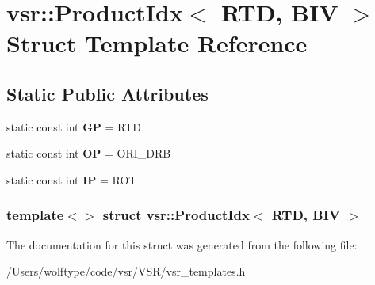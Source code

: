 \hypertarget{structvsr_1_1_product_idx_3_01_r_t_d_00_01_b_i_v_01_4}{\section{vsr\-:\-:Product\-Idx$<$ R\-T\-D, B\-I\-V $>$ Struct Template Reference}
\label{structvsr_1_1_product_idx_3_01_r_t_d_00_01_b_i_v_01_4}
}
\subsection*{Static Public Attributes}
\begin{DoxyCompactItemize}
\item 
\hypertarget{structvsr_1_1_product_idx_3_01_r_t_d_00_01_b_i_v_01_4_acbf421876f88ff8a18b6f8cd358c4d02}{static const int {\bfseries G\-P} = R\-T\-D}\label{structvsr_1_1_product_idx_3_01_r_t_d_00_01_b_i_v_01_4_acbf421876f88ff8a18b6f8cd358c4d02}

\item 
\hypertarget{structvsr_1_1_product_idx_3_01_r_t_d_00_01_b_i_v_01_4_ad6c62971e93d63936c9400ce74e8c17c}{static const int {\bfseries O\-P} = O\-R\-I\-\_\-\-D\-R\-B}\label{structvsr_1_1_product_idx_3_01_r_t_d_00_01_b_i_v_01_4_ad6c62971e93d63936c9400ce74e8c17c}

\item 
\hypertarget{structvsr_1_1_product_idx_3_01_r_t_d_00_01_b_i_v_01_4_a5f56d0c278f4d53309394d23ea637c43}{static const int {\bfseries I\-P} = R\-O\-T}\label{structvsr_1_1_product_idx_3_01_r_t_d_00_01_b_i_v_01_4_a5f56d0c278f4d53309394d23ea637c43}

\end{DoxyCompactItemize}
\subsubsection*{template$<$$>$ struct vsr\-::\-Product\-Idx$<$ R\-T\-D, B\-I\-V $>$}



The documentation for this struct was generated from the following file\-:\begin{DoxyCompactItemize}
\item 
/\-Users/wolftype/code/vsr/\-V\-S\-R/vsr\-\_\-templates.\-h\end{DoxyCompactItemize}
